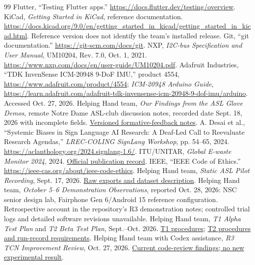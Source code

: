 \documentclass[11pt,letterpaper]{article}
\begin{document}
\begin{thebibliography}{99}
 Flutter, ``Testing Flutter apps.'' \url{https://docs.flutter.dev/testing/overview}.
 KiCad, \emph{Getting Started in KiCad}, reference documentation. \url{https://docs.kicad.org/9.0/en/getting_started_in_kicad/getting_started_in_kicad.html}. Reference version does not identify the team's installed release.
 Git, ``git documentation.'' \url{https://git-scm.com/docs/git}.
 NXP, \emph{I2C-bus Specification and User Manual}, UM10204, Rev. 7.0, Oct. 1, 2021. \url{https://www.nxp.com/docs/en/user-guide/UM10204.pdf}.
 Adafruit Industries, ``TDK InvenSense ICM-20948 9-DoF IMU,'' product 4554, \url{https://www.adafruit.com/product/4554}; \emph{ICM-20948 Arduino Guide}, \url{https://learn.adafruit.com/adafruit-tdk-invensense-icm-20948-9-dof-imu/arduino}. Accessed Oct. 27, 2026.
 Helping Hand team, \emph{Our Findings from the ASL Glove Demos}, remote Notre Dame ASL-club discussion notes, recorded date Sept. 18, 2026 with incomplete fields. \href{https://github.com/GG1627/helping-hand/blob/a35d0f5/SME.md}{Versioned formative-feedback notes}.
 A. Desai et al., ``Systemic Biases in Sign Language AI Research: A Deaf-Led Call to Reevaluate Research Agendas,'' \emph{LREC-COLING SignLang Workshop}, pp. 54--65, 2024. \url{https://aclanthology.org/2024.signlang-1.6/}.
 ITU/UNITAR, \emph{Global E-waste Monitor 2024}, 2024. \href{https://www.itu.int/en/publications/ITU-D/pages/publications.aspx?media=electronic&parent=D-GEN-E_WASTE.01-2024}{Official publication record}.
 IEEE, ``IEEE Code of Ethics.'' \url{https://ieee-cas.org/about/ieee-code-ethics}.
 Helping Hand team, \emph{Static ASL Pilot Recording}, Sept. 17, 2026. \href{https://github.com/GG1627/helping-hand/tree/a35d0f5/backend/recorded_data}{Raw exports and dataset description}.
 Helping Hand team, \emph{October 5--6 Demonstration Observations}, reported Oct. 28, 2026: NSC senior design lab, Fairphone Gen 6/Android 15 reference configuration. Retrospective account in the repository's R3 demonstration notes; controlled trial logs and detailed software revisions unavailable.
 Helping Hand team, \emph{T1 Alpha Test Plan} and \emph{T2 Beta Test Plan}, Sept.--Oct. 2026. \href{https://github.com/GG1627/helping-hand/blob/a35d0f5/docs/T1_ALPHA_TEST_PLAN.md}{T1 procedures}; \href{https://github.com/GG1627/helping-hand/blob/a35d0f5/docs/T2_Beta_Test_Plan.tex}{T2 procedures and run-record requirements}.
 Helping Hand team with Codex assistance, \emph{R3 TCN Improvement Review}, Oct. 27, 2026. \href{https://github.com/GG1627/helping-hand/blob/a35d0f5/docs/R3_TCN_IMPROVEMENT_REVIEW.md}{Current code-review findings; no new experimental result}.
\end{thebibliography}
\end{document}
